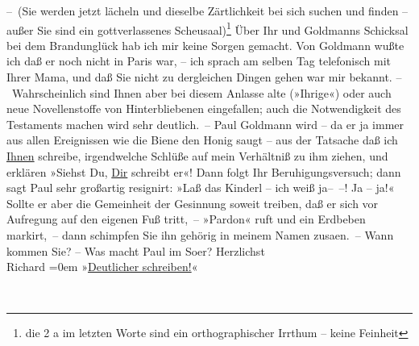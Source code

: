 \begin{ledgroupsized}[t]{13cm}
               – (Sie werden jetzt lächeln und dieselbe Zärtlichkeit bei sich suchen und finden –
               außer Sie sind ein gottverlassenes {\pb}Scheusaal)\footnote{\noindent{}die 2 a im letzten Worte sind ein orthographischer Irrthum – keine Feinheit} Über Ihr und Goldmanns Schicksal  bei dem
               Brandunglück hab ich mir keine Sorgen gemacht. Von Goldmann wußte ich daß er noch nicht in Paris war, – ich sprach am selben {\pb}Tag telefonisch mit Ihrer Mama, und daß Sie nicht zu
               dergleichen Dingen gehen war mir bekannt.\pend
           \pstart
           – Wahrscheinlich sind Ihnen aber bei diesem Anlasse alte (»Ihrige«) oder auch neue
               Novellenstoffe von Hinterbliebenen eingefallen; auch {\pb}die Notwendigkeit des Testaments
               machen wird sehr deutlich. –\pend
           \pstart
           Paul Goldmann wird – da er ja immer aus allen
               Ereignissen wie die Biene den Honig saugt – aus der Tatsache daß ich \uline{Ihnen} schreibe, irgendwelche Schlüße auf mein Verhältniß zu
               ihm ziehen, und erklären {\pb}»Siehst
               Du, \uline{Dir} schreibt er«! Dann folgt Ihr
               Beruhigungsversuch; dann sagt Paul sehr
               großartig resignirt: »Laß das Kinderl – ich weiß ja– –! Ja – ja!« Sollte er aber die
               Gemeinheit der Gesinnung soweit treiben, daß er sich vor Aufregung {\pb}auf den eigenen Fuß tritt, –
               »Pardon« ruft und ein Erdbeben markirt, – dann schimpfen Sie ihn gehörig in meinem
               Namen zusa{\geminationm}en. –\pend
           \pstart
           Wann kommen Sie? –\pend
           \pstart
           Was macht Paul im So{\geminationm}er?\pend
           \pstart
           Herzlichst{\\[\baselineskip]}\spacefill\mbox{Richard}\pend
           \leftskip=0em{}\pstart
           »\uline{Deutlicher schreiben!}«\pend
           
         
         \endnumbering{}\end{ledgroupsized}  \newcommand{\dateiname}{L00675}\newcommand{\titel}{Richard Beer-Hofmann an Arthur Schnitzler, 12. 5. 1897}\newcommand{\editorInnen}{Martin Anton Müller und Gerd-Hermann Susen}
      